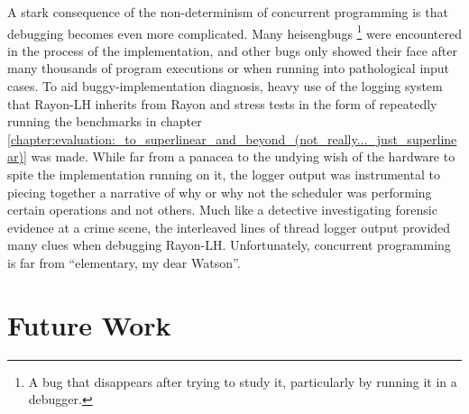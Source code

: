 \documentclass[bsc,frontabs,singlespacing,parskip,deptreport,normalheadings]{infthesis}
\begin{document}
A stark consequence of the non-determinism of concurrent programming is that
debugging becomes even more complicated. Many heisengbugs \footnote{A bug that
disappears after trying to study it, particularly by running it in a debugger.}
were encountered in the process of the implementation, and other bugs only
showed their face after many thousands of program executions or when running
into pathological input cases. To aid buggy-implementation diagnosis, heavy use
of the logging system that Rayon-LH inherits from Rayon and stress tests in the
form of repeatedly running the benchmarks in chapter
\ref{chapter:evaluation:_to_superlinear_and_beyond_(not_really..._just_superlinear)}
was made. While far from a panacea to the undying wish of the hardware to spite
the implementation running on it, the logger output was instrumental to piecing
together a narrative of why or why not the scheduler was performing certain
operations and not others. Much like a detective investigating forensic evidence
at a crime scene, the interleaved lines of thread logger output provided many
clues when debugging Rayon-LH. Unfortunately, concurrent programming is far from
``elementary, my dear Watson''.

\section{Future Work}

 

%
%
%
\end{document}
